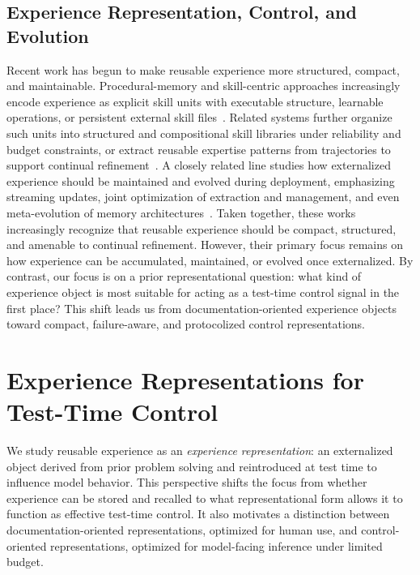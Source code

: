 \documentclass{article}
\begin{document}
\subsection{Experience Representation, Control, and Evolution}

Recent work has begun to make reusable experience more structured, compact, and maintainable. 
Procedural-memory and skill-centric approaches increasingly encode experience as explicit skill units with executable structure, learnable operations, or persistent external skill files~\cite{Memp,ProcMEM,MemSkill,Memento-Skills}. 
Related systems further organize such units into structured and compositional skill libraries under reliability and budget constraints, or extract reusable expertise patterns from trajectories to support continual refinement~\cite{CoWork-X,AutoRefine}. 
A closely related line studies how externalized experience should be maintained and evolved during deployment, emphasizing streaming updates, joint optimization of extraction and management, and even meta-evolution of memory architectures~\cite{Evo-Memory,TAME,UMEM,MemEvolve}. 
Taken together, these works increasingly recognize that reusable experience should be compact, structured, and amenable to continual refinement. 
However, their primary focus remains on how experience can be accumulated, maintained, or evolved once externalized. 
By contrast, our focus is on a prior representational question: what kind of experience object is most suitable for acting as a test-time control signal in the first place? 
This shift leads us from documentation-oriented experience objects toward compact, failure-aware, and protocolized control representations.

\section{Experience Representations for Test-Time Control}
\label{sec:representation}

We study reusable experience as an \emph{experience representation}: an externalized object derived from prior problem solving and reintroduced at test time to influence model behavior. 
This perspective shifts the focus from whether experience can be stored and recalled to what representational form allows it to function as effective test-time control. 
It also motivates a distinction between documentation-oriented representations, optimized for human use, and control-oriented representations, optimized for model-facing inference under limited budget.
\end{document}
